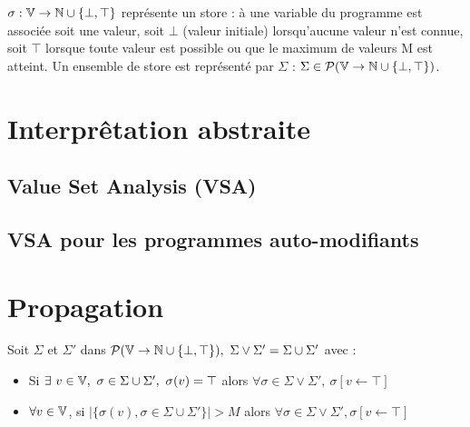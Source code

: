 
\begin{defi}
$\sigma : \mathbb V \rightarrow \mathbb N\cup\{\bot,\top\}$ représente un store : à une variable du programme est associée soit une valeur, soit $\bot$ (valeur initiale) lorsqu'aucune valeur n'est connue, soit $\top$ lorsque toute valeur est possible ou que le maximum de valeurs M est atteint. Un ensemble de store est représenté par $\Sigma$ : $\Sigma\in\mathcal P(\mathbb V\rightarrow\mathbb N\cup\{\bot,\top\})$.\\
\end{defi}


\section{Interprêtation abstraite}
\subsection{Value Set Analysis (VSA)}

\subsection{VSA pour les programmes auto-modifiants}

\section{Propagation}
\begin{defi}
Soit $\Sigma$ et $\Sigma'$ dans $\mathcal P(\mathbb V\rightarrow\mathbb N\cup\{\bot,\top\}),\ \Sigma \vee \Sigma'=\Sigma \cup \Sigma'$ avec : 
\begin{itemize}
 \item Si $\exists\ v\in\BV,\ \sigma\in\Sigma\cup\Sigma',\ \sigma(v)=\top$ alors $\forall\sigma\in\Sigma\vee\Sigma',\ \sigma[v\leftarrow\top]$
 \item $\forall v\in\mathbb V$, si $|\{\sigma(v), \sigma\in\Sigma\cup\Sigma'\}|>M$ alors $\forall\sigma\in\Sigma\vee\Sigma',\sigma[v\leftarrow\top]$
\end{itemize}
\end{defi}

